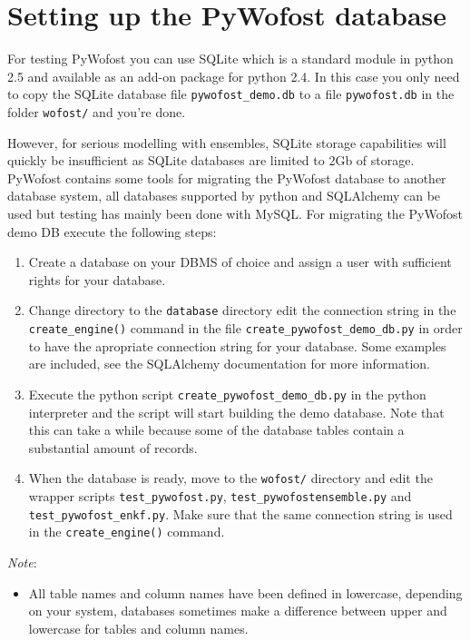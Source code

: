\documentclass[12pt]{article}
\begin{document}
\section{Setting up the PyWofost database}

For testing PyWofost you can use SQLite which is a standard module in python 2.5 and available as an add-on package for python 2.4. In this case you only need to copy the SQLite database file \texttt{pywofost\_demo.db} to a file \texttt{pywofost.db} in the folder \texttt{wofost/} and you're done.

However, for serious modelling with ensembles, SQLite storage capabilities will quickly be insufficient as SQLite databases are limited to 2Gb of storage. PyWofost contains some tools for migrating the PyWofost database to another database system, all databases supported by python and SQLAlchemy can be used but testing has mainly been done with MySQL. For migrating the PyWofost demo DB execute the following steps:
\begin{enumerate}
\item Create a database on your DBMS of choice and assign a user with sufficient rights for your database.
\item Change directory to the \texttt{database} directory edit the connection string in the \texttt{create\_engine()} command in the  file \texttt{create\_pywofost\_demo\_db.py} in order to have the apropriate connection string for your database. Some examples are included, see the SQLAlchemy documentation for more information.
\item Execute the python script \texttt{create\_pywofost\_demo\_db.py} in the python interpreter and the script will start building the demo database. Note that this can take a while because some of the database tables contain a substantial amount of records.
\item When the database is ready, move to the \texttt{wofost/} directory and edit the wrapper scripts \texttt{test\_pywofost.py},  \texttt{test\_pywofostensemble.py} and\\ \texttt{test\_pywofost\_enkf.py}. Make sure that the same connection string is used in the \texttt{create\_engine()} command.
\end{enumerate}

\emph{Note}: 
\begin{itemize}
	\item All table names and column names have been defined in lowercase, depending on your system, databases sometimes make a difference between upper and lowercase for tables and column names.
\end{itemize}
\end{document}
